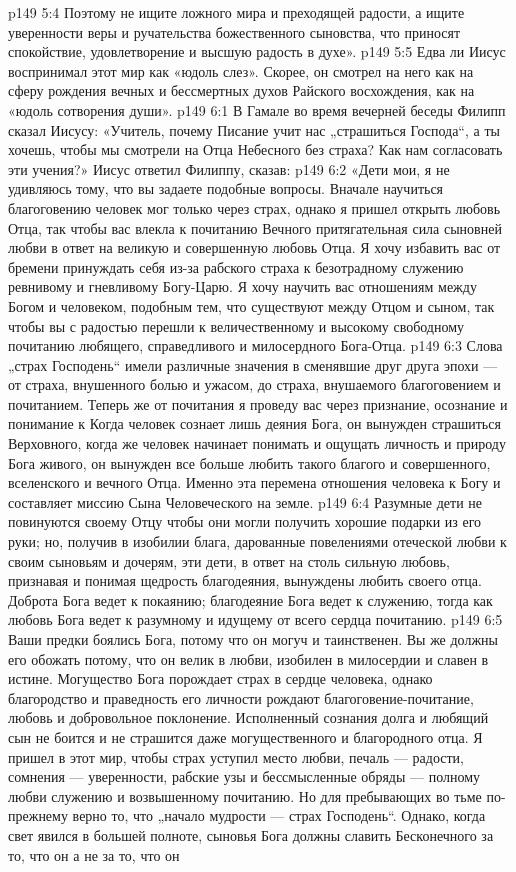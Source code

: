 \vs p149 5:4 Поэтому не ищите ложного мира и преходящей радости, а ищите уверенности веры и ручательства божественного сыновства, что приносят спокойствие, удовлетворение и высшую радость в духе».
\vs p149 5:5 \pc Едва ли Иисус воспринимал этот мир как «юдоль слез». Скорее, он смотрел на него как на сферу рождения вечных и бессмертных духов Райского восхождения, как на «юдоль сотворения души».
\vs p149 6:1 В Гамале во время вечерней беседы Филипп сказал Иисусу: «Учитель, почему Писание учит нас „страшиться Господа“, а ты хочешь, чтобы мы смотрели на Отца Небесного без страха? Как нам согласовать эти учения?» Иисус ответил Филиппу, сказав:
\vs p149 6:2 \pc «Дети мои, я не удивляюсь тому, что вы задаете подобные вопросы. Вначале научиться благоговению человек мог только через страх, однако я пришел открыть любовь Отца, так чтобы вас влекла к почитанию Вечного притягательная сила сыновней любви в ответ на великую и совершенную любовь Отца. Я хочу избавить вас от бремени принуждать себя из\hyp{}за рабского страха к безотрадному служению ревнивому и гневливому Богу\hyp{}Царю. Я хочу научить вас отношениям между Богом и человеком, подобным тем, что существуют между Отцом и сыном, так чтобы вы с радостью перешли к величественному и высокому свободному почитанию любящего, справедливого и милосердного Бога\hyp{}Отца.
\vs p149 6:3 Слова „страх Господень“ имели различные значения в сменявшие друг друга эпохи --- от страха, внушенного болью и ужасом, до страха, внушаемого благоговением и почитанием. Теперь же от почитания я проведу вас через признание, осознание и понимание к  Когда человек сознает лишь деяния Бога, он вынужден страшиться Верховного, когда же человек начинает понимать и ощущать личность и природу Бога живого, он вынужден все больше любить такого благого и совершенного, вселенского и вечного Отца. Именно эта перемена отношения человека к Богу и составляет миссию Сына Человеческого на земле.
\vs p149 6:4 Разумные дети не повинуются своему Отцу чтобы они могли получить хорошие подарки из его руки; но, получив в изобилии блага, дарованные повелениями отеческой любви к своим сыновьям и дочерям, эти дети, в ответ на столь сильную любовь, признавая и понимая щедрость благодеяния, вынуждены любить своего отца. Доброта Бога ведет к покаянию; благодеяние Бога ведет к служению, тогда как любовь Бога ведет к разумному и идущему от всего сердца почитанию.
\vs p149 6:5 Ваши предки боялись Бога, потому что он могуч и таинственен. Вы же должны его обожать потому, что он велик в любви, изобилен в милосердии и славен в истине. Могущество Бога порождает страх в сердце человека, однако благородство и праведность его личности рождают благоговение\hyp{}почитание, любовь и добровольное поклонение. Исполненный сознания долга и любящий сын не боится и не страшится даже могущественного и благородного отца. Я пришел в этот мир, чтобы страх уступил место любви, печаль --- радости, сомнения --- уверенности, рабские узы и бессмысленные обряды --- полному любви служению и возвышенному почитанию. Но для пребывающих во тьме по\hyp{}прежнему верно то, что „начало мудрости --- страх Господень“. Однако, когда свет явился в большей полноте, сыновья Бога должны славить Бесконечного за то, что он  а не за то, что он 
